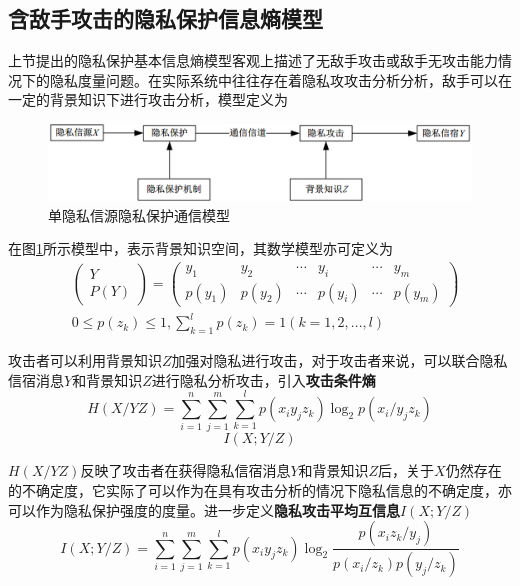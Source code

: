 \subsection{含敌手攻击的隐私保护信息熵模型}\label{subsec:privacy-preserving-attack}

上节提出的隐私保护基本信息熵模型客观上描述了无敌手攻击或敌手无攻击能力情况下的隐私度量问题。在实际系统中往往存在着隐私攻攻击分析分析，敌手可以在一定的背景知识下进行攻击分析，模型定义为
\begin{figure}[htbp]
	\centering
	\includegraphics[width = 0.95\linewidth]{./figures/Communication-Model-for-Privacy-of-Single.png}
	\caption{单隐私信源隐私保护通信模型}
	\label{fig:Communication-Model-for-Privacy-of-Single}
\end{figure}

在图\ref{fig:Communication-Model-for-Privacy-of-Single}所示模型中，表示背景知识空间，其数学模型亦可定义为
\begin{equation}
\begin{split}
&\begin{pmatrix}
Y\\ 
P(Y)
\end{pmatrix}=\begin{pmatrix}
y_{1} & y_{2} & \cdots  & y_{i} & \cdots  & y_{m}\\ 
p(y_{1})& p(y_{2}) & \cdots & p(y_{i}) & \cdots & p(y_{m})
\end{pmatrix} \\
&0 \leqslant p(z_{k})\leqslant 1,\sum_{k=1}^{l}p(z_{k})=1(k=1,2,...,l)
\end{split}
\end{equation}

攻击者可以利用背景知识$Z$加强对隐私进行攻击，对于攻击者来说，可以联合隐私信宿消息$Y$和背景知识$Z$进行隐私分析攻击，引入\textbf{攻击条件熵}
\begin{equation}
H(X/YZ)=\sum_{i=1}^{n}\sum_{j=1}^{m}\sum_{k=1}^{l}p(x_{i}y_{j}z_{k})\log_{2}p(x_{i}/y_{j}z_{k})
\end{equation}
\begin{equation*}
I(X;Y/Z)
\end{equation*}

$H(X/YZ)$反映了攻击者在获得隐私信宿消息$Y$和背景知识$Z$后，关于$X$仍然存在的不确定度，它实际了可以作为在具有攻击分析的情况下隐私信息的不确定度，亦可以作为隐私保护强度的度量。进一步定义\textbf{隐私攻击平均互信息}$I(X;Y/Z)$
\begin{equation}
I(X;Y/Z)=\sum_{i=1}^{n}\sum_{j=1}^{m}\sum_{k=1}^{l}p(x_{i}y_{j}z_{k})\log_{2}\frac{p(x_{i}z_{k}/y_{j})}{p(x_{i}/z_{k})p(y_{j}/z_{k})}
\end{equation}

